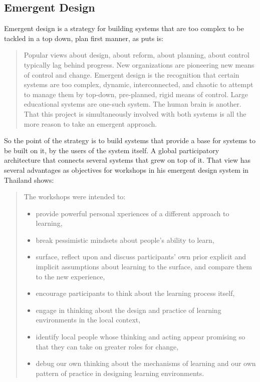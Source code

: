 \subsection{Emergent Design}

Emergent design is a strategy for building systems that are too complex to be
tackled in a top down, plan first manner, as
\cite{education:cavallo__technological_fluency} puts is:
\begin{quotation}
Popular views about design, about reform, about planning, about control
typically lag behind progress. New organizations are pioneering new means of
control and change.  Emergent design is the recognition that certain systems are
too complex, dynamic, interconnected, and chaotic to attempt to manage them by
top-down, pre-planned, rigid means of control. Large educational systems are
one-such system. The human brain is another.  That this project is
simultaneously involved with both systems is all the more reason to take an
emergent approach.
\end{quotation}

So the point of the strategy is to build systems that provide a base for systems
to be built on it, by the users of the system itself. A global participatory architecture
that connects several systems that grew on top of it. That view has several
advantages as \cite{education:cavallo__technological_fluency} objectives for workshops in his emergent design system in
Thailand shows:

\begin{quotation}
  The workshops were intended to:
    \begin{itemize}

        \item provide powerful personal
        xperiences of a different approach to learning,

        \item break pessimistic mindsets about people’s ability to learn,

        \item surface, reflect upon and discuss participants’ own prior explicit and
        implicit assumptions about learning to the surface, and compare them to the new
        experience,

        \item encourage participants to think about the learning process itself,

        \item engage in thinking about the design and practice of learning environments
        in the local context,

        \item identify local people whose thinking and acting appear promising so that
        they can take on greater roles for change,

        \item debug our own thinking about the mechanisms of learning and our own
        pattern of practice in designing learning environments.  

    \end{itemize}
\end{quotation}
